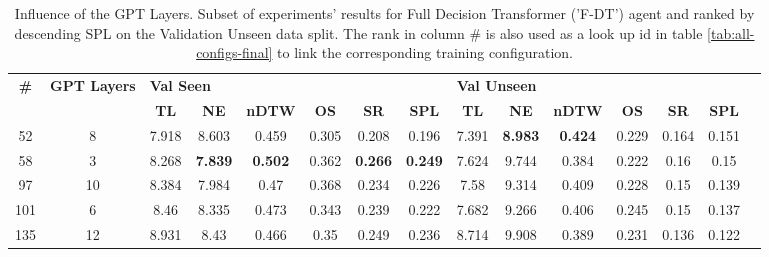 \begin{table}
\centering
\caption{\label{tab:f_dt_layers}Influence of the GPT Layers. Subset of experiments' results for Full Decision Transformer ('F-DT') agent and ranked by descending SPL on the Validation Unseen data split. The rank in column \# is also used as a look up id in table \ref{tab:all-configs-final} to link the corresponding training configuration.}
\begin{tabular}{@{\hskip3pt}c@{\hskip3pt}c@{\hskip3pt}c@{\hskip3pt}c@{\hskip3pt}c@{\hskip3pt}c@{\hskip3pt}c@{\hskip3pt}c@{\hskip3pt}c@{\hskip3pt}c@{\hskip3pt}c@{\hskip3pt}c@{\hskip3pt}c@{\hskip3pt}c@{\hskip3pt}c}
\toprule
\textbf{\#} & \textbf{GPT Layers} & \multicolumn{6}{l}{\textbf{Val Seen}} & \multicolumn{6}{l}{\textbf{Val Unseen}} \\
 \textbf{~} &          \textbf{~} &       \textbf{TL} &     \textbf{NE} &   \textbf{nDTW} & \textbf{OS} &     \textbf{SR} &    \textbf{SPL} &         \textbf{TL} &     \textbf{NE} &   \textbf{nDTW} & \textbf{OS} & \textbf{SR} & \textbf{SPL} \\
\midrule
         52 &                   8 &             7.918 &           8.603 &           0.459 &       0.305 &           0.208 &           0.196 &               7.391 &  \textbf{8.983} &  \textbf{0.424} &       0.229 &       0.164 &        0.151 \\
         58 &                   3 &             8.268 &  \textbf{7.839} &  \textbf{0.502} &       0.362 &  \textbf{0.266} &  \textbf{0.249} &               7.624 &           9.744 &           0.384 &       0.222 &        0.16 &         0.15 \\
         97 &                  10 &             8.384 &           7.984 &            0.47 &       0.368 &           0.234 &           0.226 &                7.58 &           9.314 &           0.409 &       0.228 &        0.15 &        0.139 \\
        101 &                   6 &              8.46 &           8.335 &           0.473 &       0.343 &           0.239 &           0.222 &               7.682 &           9.266 &           0.406 &       0.245 &        0.15 &        0.137 \\
        135 &                  12 &             8.931 &            8.43 &           0.466 &        0.35 &           0.249 &           0.236 &               8.714 &           9.908 &           0.389 &       0.231 &       0.136 &        0.122 \\
\bottomrule
\end{tabular}
\end{table}
